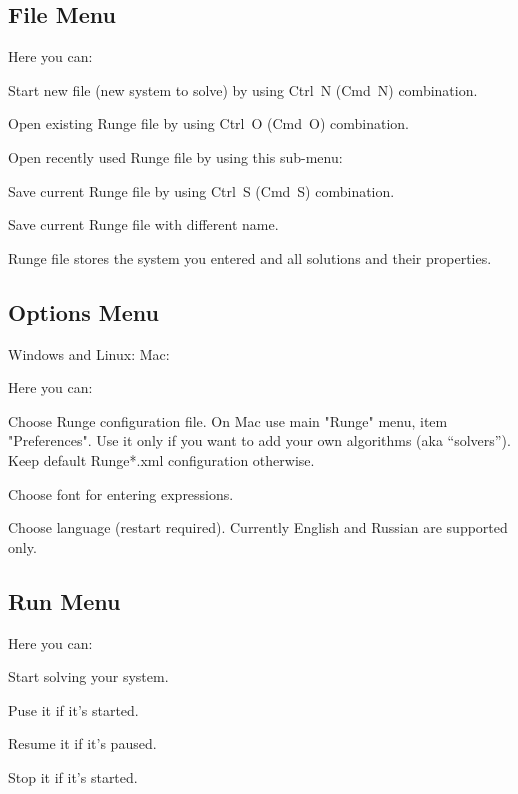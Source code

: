 \documentclass[12pt]{article}
\begin{document}
\subsection{File Menu}


Here you can:
\begin{compactitem}
\item Start new file (new system to solve) by using Ctrl~N (Cmd~N) combination.
\item Open existing Runge file by using Ctrl~O (Cmd~O) combination.
\item Open recently used Runge file by using this sub-menu:


\item Save current Runge file by using Ctrl~S (Cmd~S) combination.
\item Save current Runge file with different name.
\end{compactitem}

Runge file stores the system you entered and all solutions and their properties.


\subsection{Options Menu}

Windows and Linux:  Mac: 

Here you can:
\begin{compactitem}
\item Choose Runge configuration file. On Mac use main "Runge" menu, item "Preferences".
 Use it only if you want to add your own algorithms (aka ``solvers''). 
Keep default Runge*.xml configuration otherwise.
\item Choose font for entering expressions.
\item Choose language (restart required). Currently English and Russian are supported only.
\end{compactitem}


\subsection{Run Menu}


Here you can:
\begin{compactitem}
\item Start solving your system.
\item Puse it if it's started.
\item Resume it if it's paused.
\item Stop it if it's started.
\end{compactitem}
\end{document}
